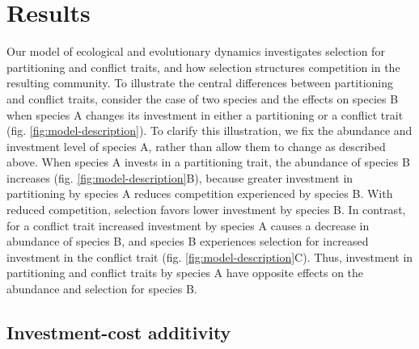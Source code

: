 \section*{Results}


Our model of ecological and evolutionary dynamics investigates selection
for partitioning and conflict traits, and how selection structures
competition in the resulting community. To illustrate the central
differences between partitioning and conflict traits, consider the case
of two species and the effects on species B when species A changes its
investment in either a partitioning or a conflict trait (fig. \ref{fig:model-description}). To
clarify this illustration, we fix the abundance and investment
level of species A, rather than allow them to change as described above.
When species A invests in a partitioning trait, the abundance of species
B increases (fig. \ref{fig:model-description}B), because greater investment in partitioning by
species A reduces competition experienced by species B. With reduced
competition, selection favors lower investment by species B. In
contrast, for a conflict trait increased investment by species A causes
a decrease in abundance of species B, and species B experiences
selection for increased investment in the conflict trait (fig. \ref{fig:model-description}C).
Thus, investment in partitioning and conflict traits by species A have
opposite effects on the abundance and selection for species B.

\subsection*{Investment-cost additivity}

